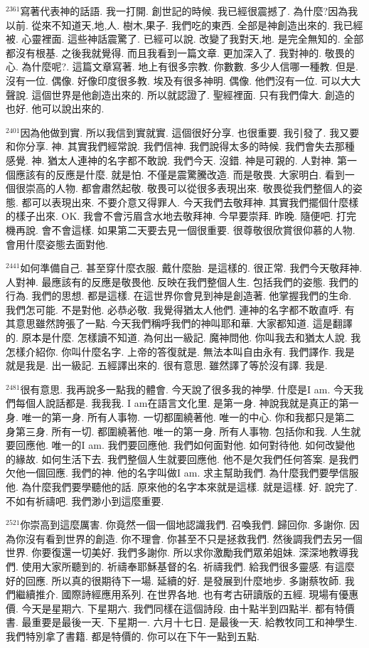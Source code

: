 \documentclass{book}
\begin{document}
$^{2361}$寫著代表神的話語.
我一打開.
創世記的時候.
我已經很震撼了.
為什麼?因為我以前.
從來不知道天,地,人.
樹木,果子.
我們吃的東西.
全部是神創造出來的.
我已經被.
心靈裡面.
這些神話震驚了.
已經可以說.
改變了我對天,地.
是完全無知的.
全部都沒有根基.
之後我就覺得.
而且我看到一篇文章.
更加深入了.
我對神的.
敬畏的心.
為什麼呢?.
這篇文章寫著.
地上有很多宗教.
你數數.
多少人信哪一種教.
但是.
沒有一位.
偶像.
好像印度很多教.
埃及有很多神明.
偶像.
他們沒有一位.
可以大大聲說.
這個世界是他創造出來的.
所以就認證了.
聖經裡面.
只有我們偉大.
創造的也好.
他可以說出來的.

$^{2401}$因為他做到實.
所以我信到實就實.
這個很好分享.
也很重要.
我引發了.
我又要和你分享.
神.
其實我們經常說.
我們信神.
我們說得太多的時候.
我們會失去那種感覺.
神.
猶太人連神的名字都不敢說.
我們今天.
沒錯.
神是可親的.
人對神.
第一個應該有的反應是什麼.
就是怕.
不僅是震驚騰改造.
而是敬畏.
大家明白.
看到一個很崇高的人物.
都會肅然起敬.
敬畏可以從很多表現出來.
敬畏從我們整個人的姿態.
都可以表現出來.
不要介意又得罪人.
今天我們去敬拜神.
其實我們擺個什麼樣的樣子出來.
OK.
我會不會污眉含水地去敬拜神.
今早要崇拜.
昨晚.
隨便吧.
打完機再說.
會不會這樣.
如果第二天要去見一個很重要.
很尊敬很欣賞很仰慕的人物.
會用什麼姿態去面對他.

$^{2441}$如何準備自己.
甚至穿什麼衣服.
戴什麼胎.
是這樣的.
很正常.
我們今天敬拜神.
人對神.
最應該有的反應是敬畏他.
反映在我們整個人生.
包括我們的姿態.
我們的行為.
我們的思想.
都是這樣.
在這世界你會見到神是創造著.
他掌握我們的生命.
我們怎可能.
不是對他.
必恭必敬.
我覺得猶太人他們.
連神的名字都不敢直呼.
有其意思雖然誇張了一點.
今天我們稱呼我們的神叫耶和華.
大家都知道.
這是翻譯的.
原本是什麼.
怎樣讀不知道.
為何出一級記.
魔神問他.
你叫我去和猶太人說.
我怎樣介紹你.
你叫什麼名字.
上帝的答復就是.
無法本叫自由永有.
我們譯作.
我是就是我是.
出一級記.
五經譯出來的.
很有意思.
雖然譯了等於沒有譯.
我是.

$^{2481}$很有意思.
我再說多一點我的體會.
今天說了很多我的神學.
什麼是I am.
今天我們每個人說話都是.
我我我.
I am在語言文化里.
是第一身.
神說我就是真正的第一身.
唯一的第一身.
所有人事物.
一切都圍繞著他.
唯一的中心.
你和我都只是第二身第三身.
所有一切.
都圍繞著他.
唯一的第一身.
所有人事物.
包括你和我.
人生就要回應他.
唯一的I am.
我們要回應他.
我們如何面對他.
如何對待他.
如何改變他的緣故.
如何生活下去.
我們整個人生就要回應他.
他不是欠我們任何答案.
是我們欠他一個回應.
我們的神.
他的名字叫做I am.
求主幫助我們.
為什麼我們要學信服他.
為什麼我們要學聽他的話.
原來他的名字本來就是這樣.
就是這樣.
好.
說完了.
不如有祈禱吧.
我們渺小到這麼重要.

$^{2521}$你崇高到這麼厲害.
你竟然一個一個地認識我們.
召喚我們.
歸回你.
多謝你.
因為你沒有看到世界的創造.
你不理會.
你甚至不只是拯救我們.
然後調我們去另一個世界.
你要復還一切美好.
我們多謝你.
所以求你激勵我們眾弟姐妹.
深深地教導我們.
使用大家所聽到的.
祈禱奉耶穌基督的名.
祈禱我們.
給我們很多靈感.
有這麼好的回應.
所以真的很期待下一場.
延續的好.
是發展到什麼地步.
多謝蔡牧師.
我們繼續推介.
國際詩經應用系列.
在世界各地.
也有考古研讀版的五經.
現場有優惠價.
今天是星期六.
下星期六.
我們同樣在這個詩段.
由十點半到四點半.
都有特價書.
最重要是最後一天.
下星期一.
六月十七日.
是最後一天.
給教牧同工和神學生.
我們特別拿了書籍.
都是特價的.
你可以在下午一點到五點.
\end{document}
